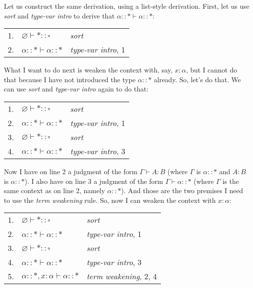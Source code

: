 \documentclass{book}
\numberwithin{equation}{chapter}
\begin{document}
Let us construct the same derivation, using a list-style derivation. First, let us use \textit{sort} and \textit{type-var intro} to derive that $\alpha :: \ast \vdash \alpha :: \ast$:

\begin{center}
\begin{tabular}[t]{l l l}
1. & $\varnothing \vdash \ast :: \square$ & \textit{sort} \\
2. & $\alpha :: \ast \vdash \alpha :: \ast$ & \textit{type-var intro}, 1
\end{tabular}
\end{center}

\noindent
What I want to do next is weaken the context with, say, $x : \alpha$, but I cannot do that because I have not introduced the type $\alpha :: \ast$ already. So, let's do that. We can use \textit{sort} and \textit{type-var intro} again to do that:

\begin{center}
\begin{tabular}[t]{l l l}
1. & $\varnothing \vdash \ast :: \square$ & \textit{sort} \\
2. & $\alpha :: \ast \vdash \alpha :: \ast$ & \textit{type-var intro}, 1 \\
3. & $\varnothing \vdash \ast :: \square$ & \textit{sort} \\
4. & $\alpha :: \ast \vdash \alpha :: \ast$ & \textit{type-var intro}, 3
\end{tabular}
\end{center}

\noindent
Now I have on line 2 a judgment of the form $\Gamma \vdash A : B$ (where $\Gamma$ is $\alpha :: \ast$ and $A : B$ is $\alpha :: \ast$). I also have on line 3 a judgment of the form $\Gamma \vdash \alpha :: \ast$ (where $\Gamma$ is the same context as on line 2, namely $\alpha :: \ast$). And those are the two premises I need to use the \textit{term weakening} rule. So, now I can weaken the context with $x : \alpha$:

\begin{center}
\begin{tabular}[t]{l l l}
1. & $\varnothing \vdash \ast :: \square$ & \textit{sort} \\
2. & $\alpha :: \ast \vdash \alpha :: \ast$ & \textit{type-var intro}, 1 \\
3. & $\varnothing \vdash \ast :: \square$ & \textit{sort} \\
4. & $\alpha :: \ast \vdash \alpha :: \ast$ & \textit{type-var intro}, 3 \\
5. & $\alpha :: \ast, x : \alpha \vdash \alpha :: \ast$ & \textit{term weakening}, 2, 4
\end{tabular}
\end{center}
\end{document}
